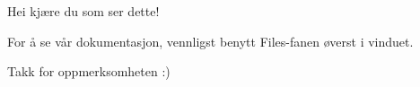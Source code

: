 Hei kjære du som ser dette!

For å se vår dokumentasjon, vennligst benytt Files-\/fanen øverst i vinduet.

Takk for oppmerksomheten \+:) 